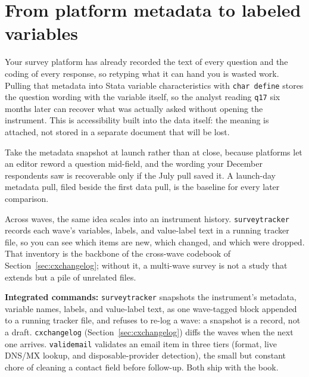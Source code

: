 \section{From platform metadata to labeled variables}
Your survey platform has already recorded the text of every question and the coding of every response, so retyping what it can hand you is wasted work. Pulling that metadata into Stata variable characteristics with \texttt{char define} stores the question wording with the variable itself, so the analyst reading \texttt{q17} six months later can recover what was actually asked without opening the instrument. This is accessibility built into the data itself: the meaning is attached, not stored in a separate document that will be lost.

Take the metadata snapshot at launch rather than at close, because platforms let an editor reword a question mid-field, and the wording your December respondents saw is recoverable only if the July pull saved it. A launch-day metadata pull, filed beside the first data pull, is the baseline for every later comparison.

Across waves, the same idea scales into an instrument history. \texttt{surveytracker} records each wave's variables, labels, and value-label text in a running tracker file, so you can see which items are new, which changed, and which were dropped. That inventory is the backbone of the cross-wave codebook of Section~\ref{sec:cxchangelog}; without it, a multi-wave survey is not a study that extends but a pile of unrelated files.

\begin{kaobox}[frametitle=Package Integration: \texttt{surveytracker} and \texttt{validemail}]
\textbf{Integrated commands:} \texttt{surveytracker} snapshots the instrument's metadata, variable names, labels, and value-label text, as one wave-tagged block appended to a running tracker file, and refuses to re-log a wave: a snapshot is a record, not a draft. \texttt{cxchangelog} (Section~\ref{sec:cxchangelog}) diffs the waves when the next one arrives. \texttt{validemail} validates an email item in three tiers (format, live DNS/MX lookup, and disposable-provider detection), the small but constant chore of cleaning a contact field before follow-up. Both ship with the book.
\end{kaobox}

